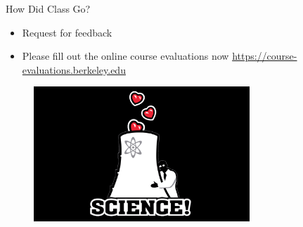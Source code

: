 \documentclass[xcolor=x11names,compress, handout]{beamer}
\renewcommand{\(}{\begin{columns}}
\renewcommand{\)}{\end{columns}}
\newcommand{\<}[1]{\begin{column}{#1}}
\renewcommand{\>}{\end{column}}
\begin{document}
\begin{frame}{How Did Class Go?}

    \begin{itemize}
    \item Request for feedback    
	\vspace*{.5em}
	\pause
	\item Please fill out the online course evaluations now \href{ https://course-evaluations.berkeley.edu}{ https://course-evaluations.berkeley.edu}
    \end{itemize}
    
    \begin{figure}
  	\begin{center}
  		\includegraphics[height=2in,clip]{fig/science}
	\end{center}
  	\end{figure}

\end{frame}
\end{document}
